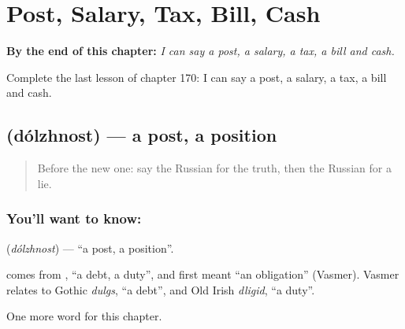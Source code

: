 
\chapter{Post, Salary, Tax, Bill, Cash}
\label{ch:ru-post-salary-tax-bill-cash}

\begin{chapteropening}
\textbf{By the end of this chapter:} \emph{I can say a post, a salary, a tax, a bill and cash.}

Complete the last lesson of chapter 170: I can say a post, a salary, a tax, a bill and cash.
\end{chapteropening}

\section[\texorpdfstring{\ru{должность} (dólzhnost)}{должность (dólzhnost)}]{ (dólzhnost) — a post, a position}

\label{lesson:RU-C170-dolzhnost}



\begin{quote}
Before the new one: say the Russian for the truth, then the Russian for a lie.
\end{quote}

\subsection*{You'll want to know: }
\textbf{} (\emph{dólzhnost}) — \textquotedblleft{}a post, a position\textquotedblright{}.

\begin{cousinweb}
\textbf{} comes from \emph{}, \textquotedblleft{}a debt, a duty\textquotedblright{}, and first meant \textquotedblleft{}an obligation\textquotedblright{} (Vasmer). Vasmer relates \emph{} to Gothic \emph{dulgs}, \textquotedblleft{}a debt\textquotedblright{}, and Old Irish \emph{dligid}, \textquotedblleft{}a duty\textquotedblright{}.
\end{cousinweb}

\begin{grammarlens}[title={What you've built}]
One more word for this chapter.
\end{grammarlens}

